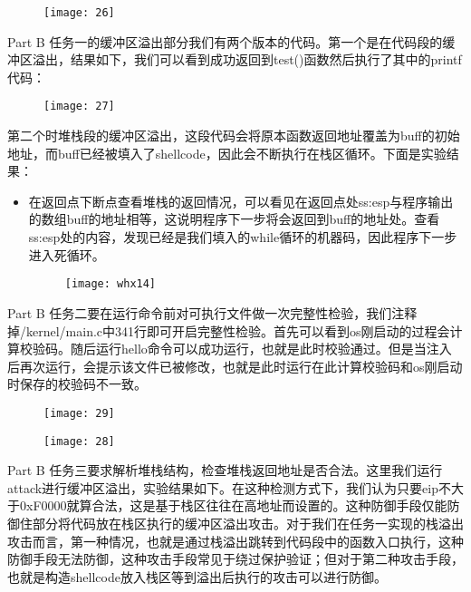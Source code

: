 \documentclass{whureport}
\begin{document}
\begin{figure}[H]
\centering
\texttt{[image: 26]}
\end{figure}

Part B 任务一的缓冲区溢出部分我们有两个版本的代码。第一个是在代码段的缓冲区溢出，结果如下，我们可以看到成功返回到test()函数然后执行了其中的printf代码：

\begin{figure}[H]
\centering
\texttt{[image: 27]}
\end{figure}

第二个时堆栈段的缓冲区溢出，这段代码会将原本函数返回地址覆盖为buff的初始地址，而buff已经被填入了shellcode，因此会不断执行在栈区循环。下面是实验结果：

\begin{itemize}
\begin{figure}[H]
	\centering
	\texttt{[image: whx12]}
\end{figure}
	\item 在返回点下断点查看堆栈的返回情况，可以看见在返回点处ss:esp与程序输出的数组buff的地址相等，这说明程序下一步将会返回到buff的地址处。查看ss:esp处的内容，发现已经是我们填入的while循环的机器码，因此程序下一步进入死循环。
	\begin{figure}[H]
		\centering
		\texttt{[image: whx14]}
	\end{figure}
\end{itemize}

Part B 任务二要在运行命令前对可执行文件做一次完整性检验，我们注释掉/kernel/main.c中341行即可开启完整性检验。首先可以看到os刚启动的过程会计算校验码。随后运行hello命令可以成功运行，也就是此时校验通过。但是当注入后再次运行，会提示该文件已被修改，也就是此时运行在此计算校验码和os刚启动时保存的校验码不一致。

\begin{figure}[H]
\centering
\texttt{[image: 29]}
\end{figure}

\begin{figure}[H]
\centering
\texttt{[image: 28]}
\end{figure}

Part B 任务三要求解析堆栈结构，检查堆栈返回地址是否合法。这里我们运行attack进行缓冲区溢出，实验结果如下。在这种检测方式下，我们认为只要eip不大于0xF0000就算合法，这是基于栈区往往在高地址而设置的。这种防御手段仅能防御住部分将代码放在栈区执行的缓冲区溢出攻击。对于我们在任务一实现的栈溢出攻击而言，第一种情况，也就是通过栈溢出跳转到代码段中的函数入口执行，这种防御手段无法防御，这种攻击手段常见于绕过保护验证；但对于第二种攻击手段，也就是构造shellcode放入栈区等到溢出后执行的攻击可以进行防御。
\end{document}
